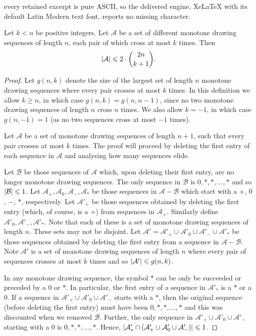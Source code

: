 \documentclass[10pt,a4paper]{amsart}
\DeclarePairedDelimiter{\abs}{\lvert}{\rvert} %
\newcommand{\BB}{\mathcal{B}}
\renewcommand{\AA}{\mathcal{A}}
\renewcommand{\geq}{\geqslant}
\renewcommand{\leq}{\leqslant}
\begin{document}
every retained excerpt is pure ASCII, so the delivered engine, XeLaTeX with its default Latin Modern text font, reports no missing character.
\begin{lemma}\label{sequencebound}
    Let $k < n$ be positive integers. Let $\AA$ be a set of different monotone drawing sequences of length $n$, each pair of which cross at most $k$ times. Then
    \begin{equation*}
        \abs{\AA} \leq 2 \cdot \binom{2n}{k + 1}.
    \end{equation*}
\end{lemma}

\begin{proof}
    Let $g(n, k)$ denote the size of the largest set of length $n$ monotone drawing sequences where every pair crosses at most $k$ times. In this definition we allow $k \geq n$, in which case $g(n, k) = g(n, n - 1)$, since no two monotone drawing sequences of length $n$ cross $n$ times. We also allow $k = -1$, in which case $g(n, -1) = 1$ (as no two sequences cross at most $-1$ times).

    Let $\AA$ be a set of monotone drawing sequences of length $n + 1$, such that every pair crosses at most $k$ times. The proof will proceed by deleting the first entry of each sequence in $\AA$ and analysing how many sequences elide.

    Let $\BB$ be those sequences of $\AA$ which, upon deleting their first entry, are no longer monotone drawing sequences. The only sequence in $\BB$ is $0, \ast, \ast, \dots, \ast$ and so $\abs{\BB} \leq 1$. Let $\AA_{+}, \AA_{0}, \AA_{-}, \AA_{\ast}$ be those sequences in $\AA - \BB$ which start with a $+$, $0$, $-$, $\ast$, respectively. Let $\AA'_{+}$ be those sequences obtained by deleting the first entry (which, of course, is a $+$) from sequences in $\AA_{+}$. Similarly define $\AA'_{0}, \AA'_{-}, \AA'_{\ast}$. Note that each of these is a set of monotone drawing sequences of length $n$. These sets may not be disjoint. Let $\AA' = \AA'_{+} \cup \AA'_{0} \cup \AA'_{-} \cup \AA'_{\ast}$ be those sequences obtained by deleting the first entry from a sequence in $\AA - \BB$. Note $\AA'$ is a set of monotone drawing sequences of length $n$ where every pair of sequences crosses at most $k$ times and so $\abs{\AA'} \leq g(n, k)$.

    In any monotone drawing sequence, the symbol $\ast$ can be only be succeeded or preceded by a $0$ or $\ast$. In particular, the first entry of a sequence in $\AA'_{\ast}$ is a $\ast$ or a $0$. If a sequence in $\AA'_{+} \cup \AA'_{0} \cup \AA'_{-}$ starts with a $\ast$, then the original sequence (before deleting the first entry) must have been $0, \ast, \ast, \dotsc, \ast$ and this was discounted when we removed $\BB$. Further, the only sequence in $\AA'_{+} \cup \AA'_{0} \cup \AA'_{-}$ starting with a $0$ is $0, \ast, \ast, \dotsc, \ast$. Hence, $\abs{\AA'_{\ast} \cap (\AA'_{+} \cup \AA'_{0} \cup \AA'_{-})} \leq 1$.


\end{proof}
\end{document}

